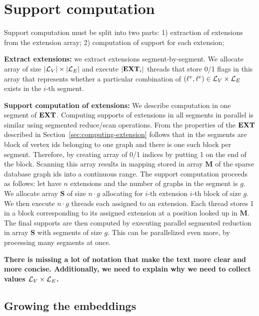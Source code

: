 \section{Support computation}

Support computation must be split into two parts: 1) extraction of
extensions from the extension array; 2) computation of support for
each extension;

\noindent\textbf{Extract extensions:} we extract extensions
segment-by-segment. We allocate array of size $|\allvlabels|\times
|\allelabels|$ and execute $|\mathbf{EXT}_i|$ threads that store
0/1 flags in this array that represents whether a particular
combination of $(\elabel, \vlabel)\in \allvlabels\times \allelabels$
exists in the $i$-th segment.

\noindent\textbf{Support computation of extensions:} We describe
computation in one segment of $\mathbf{EXT}$. Computing supports of
extensions in all segments in parallel is similar using segmented
reduce/scan operations. From the properties of the $\mathbf{EXT}$
described in Section~\ref{sec:computing-extension} follows that in the
segments are block of vertex ids belonging to one graph and there is
one such block per segment. Therefore, by creating array of 0/1
indices by putting 1 on the end of the block. Scanning this array
results in mapping stored in array $\mathbf{M}$ of the sparse database
graph ids into a continuous range. The support computation proceeds as
follows: let have $n$ extensions and the number of graphs in the
segment is $g$. We allocate array $\mathbf{S}$ of size $n\cdot g$
allocating for $i$-th extension $i$-th block of size $g$. We then
execute $n\cdot g$ threads each assigned to an extension. Each thread
stores 1 in a block corresponding to its assigned extension at a
position looked up in $\mathbf{M}$. The final supports are then
computed by executing parallel segmented reduction in array
$\mathbf{S}$ with segments of size $g$. This can be parallelized even
more, by processing many segments at once.



\textbf{There is missing a lot of notation that make the text more
  clear and more concise. Additionally, we need to explain why we need
  to collect values $\allvlabels\times \allelabels$.}



\subsection{Growing the embeddings}

